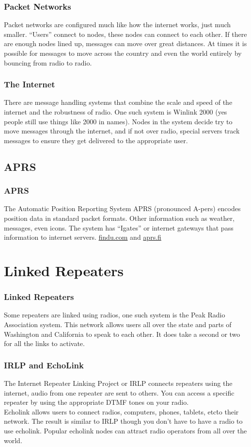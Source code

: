 \documentclass[10pt]{beamer}
\begin{document}
\begin{frame}
\frametitle{Packet Networks}
Packet networks are configured much like how the internet works, just much smaller. ``Users'' connect to nodes, these nodes can connect to each other. If there are enough nodes lined up, messages can move over great distances. At times it is possible for messages to move across the country and even the world entirely by bouncing from radio to radio.
\end{frame}

\begin{frame}
\frametitle{The Internet}
There are message handling systems that combine the scale and speed of the internet and the robustness of radio. One such system is Winlink 2000 (yes people still use things like 2000 in names). Nodes in the system decide try to move messages through the internet, and if not over radio, special servers track messages to ensure they get delivered to the appropriate user.
\end{frame}

\subsection{APRS}
\begin{frame}
\frametitle{APRS}
The Automatic Position Reporting System APRS (pronounced A-pers) encodes position data in standard packet formats. Other information such as weather, messages, even icons. The system has ``Igates'' or internet gateways that pass information to internet servers. \hyperlink{www.findu.com}{findu.com} and \hyperlink{www.aprs.fi}{aprs.fi}
\end{frame}

\section{Linked Repeaters}

\begin{frame}
\frametitle{Linked Repeaters}
Some repeaters are linked using radios, one such system is the Peak Radio Association system. This network allows users all over the state and parts of Washington and California to speak to each other. It does take a second or two for all the links to activate.
\end{frame}

\begin{frame}
\frametitle{IRLP and EchoLink}
The Internet Repeater Linking Project or IRLP connects repeaters using the internet, audio from one repeater are sent to others. You can access a specific repeater by using the appropriate DTMF tones on your radio.\\
Echolink allows users to connect radios, computers, phones, tablets, etc\. to their network. The result is similar to IRLP though you don't have to have a radio to use echolink. Popular echolink nodes can attract radio operators from all over the world.
\end{frame}
\end{document}
